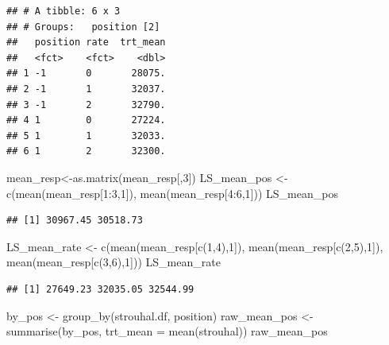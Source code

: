 \documentclass[
]{book}
\newenvironment{Shaded}{\begin{snugshade}}{\end{snugshade}}
\newcommand{\AttributeTok}[1]{\textcolor[rgb]{0.77,0.63,0.00}{#1}}
\newcommand{\DecValTok}[1]{\textcolor[rgb]{0.00,0.00,0.81}{#1}}
\newcommand{\FunctionTok}[1]{\textcolor[rgb]{0.00,0.00,0.00}{#1}}
\newcommand{\NormalTok}[1]{#1}
\newcommand{\OtherTok}[1]{\textcolor[rgb]{0.56,0.35,0.01}{#1}}
\newcommand{\SpecialCharTok}[1]{\textcolor[rgb]{0.00,0.00,0.00}{#1}}
\begin{document}
\begin{verbatim}
## # A tibble: 6 x 3
## # Groups:   position [2]
##   position rate  trt_mean
##   <fct>    <fct>    <dbl>
## 1 -1       0       28075.
## 2 -1       1       32037.
## 3 -1       2       32790.
## 4 1        0       27224.
## 5 1        1       32033.
## 6 1        2       32300.
\end{verbatim}

\begin{Shaded}
\begin{Highlighting}[]
\NormalTok{mean\_resp}\OtherTok{\textless{}{-}}\FunctionTok{as.matrix}\NormalTok{(mean\_resp[,}\DecValTok{3}\NormalTok{])}
\NormalTok{LS\_mean\_pos }\OtherTok{\textless{}{-}} \FunctionTok{c}\NormalTok{(}\FunctionTok{mean}\NormalTok{(mean\_resp[}\DecValTok{1}\SpecialCharTok{:}\DecValTok{3}\NormalTok{,}\DecValTok{1}\NormalTok{]), }\FunctionTok{mean}\NormalTok{(mean\_resp[}\DecValTok{4}\SpecialCharTok{:}\DecValTok{6}\NormalTok{,}\DecValTok{1}\NormalTok{]))}
\NormalTok{LS\_mean\_pos}
\end{Highlighting}
\end{Shaded}

\begin{verbatim}
## [1] 30967.45 30518.73
\end{verbatim}

\begin{Shaded}
\begin{Highlighting}[]
\NormalTok{LS\_mean\_rate }\OtherTok{\textless{}{-}} \FunctionTok{c}\NormalTok{(}\FunctionTok{mean}\NormalTok{(mean\_resp[}\FunctionTok{c}\NormalTok{(}\DecValTok{1}\NormalTok{,}\DecValTok{4}\NormalTok{),}\DecValTok{1}\NormalTok{]), }\FunctionTok{mean}\NormalTok{(mean\_resp[}\FunctionTok{c}\NormalTok{(}\DecValTok{2}\NormalTok{,}\DecValTok{5}\NormalTok{),}\DecValTok{1}\NormalTok{]), }\FunctionTok{mean}\NormalTok{(mean\_resp[}\FunctionTok{c}\NormalTok{(}\DecValTok{3}\NormalTok{,}\DecValTok{6}\NormalTok{),}\DecValTok{1}\NormalTok{]))}
\NormalTok{LS\_mean\_rate}
\end{Highlighting}
\end{Shaded}

\begin{verbatim}
## [1] 27649.23 32035.05 32544.99
\end{verbatim}

\begin{Shaded}
\begin{Highlighting}[]
\NormalTok{by\_pos }\OtherTok{\textless{}{-}} \FunctionTok{group\_by}\NormalTok{(strouhal.df, position)}
\NormalTok{raw\_mean\_pos }\OtherTok{\textless{}{-}} \FunctionTok{summarise}\NormalTok{(by\_pos, }\AttributeTok{trt\_mean =} \FunctionTok{mean}\NormalTok{(strouhal))}
\NormalTok{raw\_mean\_pos}
\end{Highlighting}
\end{Shaded}
\end{document}
